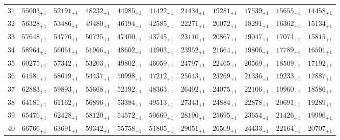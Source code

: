 \documentclass[10pt, a4paper]{article}
\begin{document}
\begin{center}
\begin{tabular}{c || c c c c c | c c c c c}
        \hline
        31 & \({55003}_{+1}\) & \({52191}_{+1}\) & \({48232}_{+1}\) & \({44985}_{+1}\) & \({41422}_{+1}\) & \({21434}_{+1}\) & \({19281}_{+1}\) & \({17539}_{+1}\) & \({15655}_{+1}\) & \({14458}_{+1}\)\\
        32 & \({56328}_{+1}\) & \({53486}_{+1}\) & \({49480}_{+1}\) & \({46194}_{+1}\) & \({42585}_{+1}\) & \({22271}_{+1}\) & \({20072}_{+1}\) & \({18291}_{+1}\) & \({16362}_{+1}\) & \({15134}_{+1}\)\\
        33 & \({57648}_{+1}\) & \({54776}_{+1}\) & \({50725}_{+1}\) & \({47400}_{+1}\) & \({43745}_{+1}\) & \({23110}_{+1}\) & \({20867}_{+1}\) & \({19047}_{+1}\) & \({17074}_{+1}\) & \({15815}_{+1}\)\\
        34 & \({58964}_{+1}\) & \({56061}_{+1}\) & \({51966}_{+1}\) & \({48602}_{+1}\) & \({44903}_{+1}\) & \({23952}_{+1}\) & \({21664}_{+1}\) & \({19806}_{+1}\) & \({17789}_{+1}\) & \({16501}_{+1}\)\\
        35 & \({60275}_{+1}\) & \({57342}_{+1}\) & \({53203}_{+1}\) & \({49802}_{+1}\) & \({46059}_{+1}\) & \({24797}_{+1}\) & \({22465}_{+1}\) & \({20569}_{+1}\) & \({18509}_{+1}\) & \({17192}_{+1}\)\\
        \hline
        36 & \({61581}_{+1}\) & \({58619}_{+1}\) & \({54437}_{+1}\) & \({50998}_{+1}\) & \({47212}_{+1}\) & \({25643}_{+1}\) & \({23269}_{+1}\) & \({21336}_{+1}\) & \({19233}_{+1}\) & \({17887}_{+1}\)\\
        37 & \({62883}_{+1}\) & \({59893}_{+1}\) & \({55668}_{+1}\) & \({52192}_{+1}\) & \({48363}_{+1}\) & \({26492}_{+1}\) & \({24075}_{+1}\) & \({22106}_{+1}\) & \({19960}_{+1}\) & \({18586}_{+1}\)\\
        38 & \({64181}_{+1}\) & \({61162}_{+1}\) & \({56896}_{+1}\) & \({53384}_{+1}\) & \({49513}_{+1}\) & \({27343}_{+1}\) & \({24884}_{+1}\) & \({22878}_{+1}\) & \({20691}_{+1}\) & \({19289}_{+1}\)\\
        39 & \({65476}_{+1}\) & \({62428}_{+1}\) & \({58120}_{+1}\) & \({54572}_{+1}\) & \({50660}_{+1}\) & \({28196}_{+1}\) & \({25695}_{+1}\) & \({23654}_{+1}\) & \({21426}_{+1}\) & \({19996}_{+1}\)\\
        40 & \({66766}_{+1}\) & \({63691}_{+1}\) & \({59342}_{+1}\) & \({55758}_{+1}\) & \({51805}_{+1}\) & \({29051}_{+1}\) & \({26509}_{+1}\) & \({24433}_{+1}\) & \({22164}_{+1}\) & \({20707}_{+1}\)\\
        \hline
    \end{tabular}
\end{center}
\pagebreak
\end{document}
